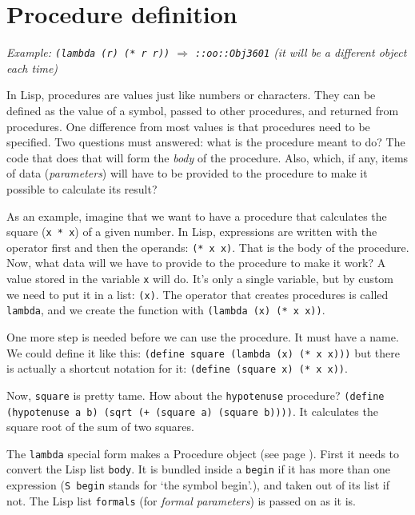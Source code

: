 \documentclass[twoside]{report}
\begin{document}
\section{Procedure definition}
\label{procedure-definition}

\emph{Example: \texttt{(lambda (r) (* r r))} $\Rightarrow$ \texttt{::oo::Obj3601} (it will be a different object each time)}

In Lisp, procedures are values just like numbers or characters. They can be defined as the value of a symbol, passed to other procedures, and returned from procedures. One difference from most values is that procedures need to be specified. Two questions must answered: what is the procedure meant to do? The code that does that will form the \emph{body} of the procedure. Also, which, if any, items of data (\emph{parameters}) will have to be provided to the procedure to make it possible to calculate its result?

As an example, imagine that we want to have a procedure that calculates the square (\texttt{x * x}) of a given number. In Lisp, expressions are written with the operator first and then the operands: \texttt{(* x x)}. That is the body of the procedure. Now, what data will we have to provide to the procedure to make it work? A value stored in the variable \texttt{x} will do. It's only a single variable, but by custom we need to put it in a list: \texttt{(x)}. The operator that creates procedures is called \texttt{lambda}, and we create the function with \texttt{(lambda (x) (* x x))}.

One more step is needed before we can use the procedure. It must have a name. We could define it like this: \texttt{(define square (lambda (x) (* x x)))} but there is actually a shortcut notation for it: \texttt{(define (square x) (* x x))}.

Now, \texttt{square} is pretty tame. How about the \texttt{hypotenuse} procedure? \texttt{(define (hypotenuse a b) (sqrt (+ (square a) (square b))))}. It calculates the square root of the sum of two squares.

The \texttt{lambda} special form makes a Procedure object (see page \pageref{control}). First it needs to convert the Lisp list \texttt{body}. It is bundled inside a \texttt{begin} if it has more than one expression (\texttt{S begin} stands for `the symbol begin'.), and taken out of its list if not. The Lisp list \texttt{formals} (for \emph{formal parameters}) is passed on as it is.
\end{document}
